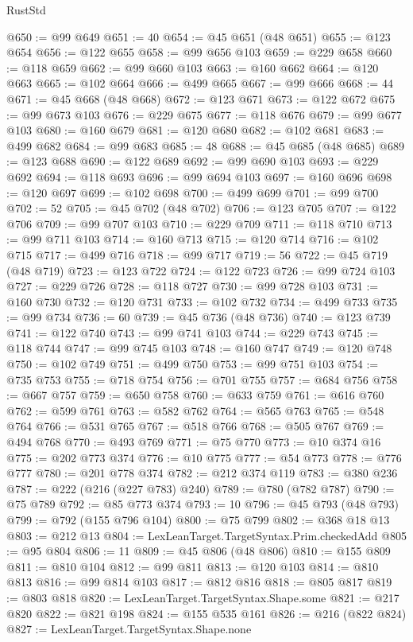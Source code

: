 \begin{lexlean}{RustStd}
\begin{coremodule}
{\begin{coremodule}
{{{{{{{{{{{{{{{{{{{{{{{{{{{{{{{{{@650 := @99 @649
@651 := 40
@654 := @45 @651 (@48 @651)
@655 := @123 @654
@656 := @122 @655
@658 := @99 @656 @103
@659 := @229 @658
@660 := @118 @659
@662 := @99 @660 @103
@663 := @160 @662
@664 := @120 @663
@665 := @102 @664
@666 := @499 @665
@667 := @99 @666
@668 := 44
@671 := @45 @668 (@48 @668)
@672 := @123 @671
@673 := @122 @672
@675 := @99 @673 @103
@676 := @229 @675
@677 := @118 @676
@679 := @99 @677 @103
@680 := @160 @679
@681 := @120 @680
@682 := @102 @681
@683 := @499 @682
@684 := @99 @683
@685 := 48
@688 := @45 @685 (@48 @685)
@689 := @123 @688
@690 := @122 @689
@692 := @99 @690 @103
@693 := @229 @692
@694 := @118 @693
@696 := @99 @694 @103
@697 := @160 @696
@698 := @120 @697
@699 := @102 @698
@700 := @499 @699
@701 := @99 @700
@702 := 52
@705 := @45 @702 (@48 @702)
@706 := @123 @705
@707 := @122 @706
@709 := @99 @707 @103
@710 := @229 @709
@711 := @118 @710
@713 := @99 @711 @103
@714 := @160 @713
@715 := @120 @714
@716 := @102 @715
@717 := @499 @716
@718 := @99 @717
@719 := 56
@722 := @45 @719 (@48 @719)
@723 := @123 @722
@724 := @122 @723
@726 := @99 @724 @103
@727 := @229 @726
@728 := @118 @727
@730 := @99 @728 @103
@731 := @160 @730
@732 := @120 @731
@733 := @102 @732
@734 := @499 @733
@735 := @99 @734
@736 := 60
@739 := @45 @736 (@48 @736)
@740 := @123 @739
@741 := @122 @740
@743 := @99 @741 @103
@744 := @229 @743
@745 := @118 @744
@747 := @99 @745 @103
@748 := @160 @747
@749 := @120 @748
@750 := @102 @749
@751 := @499 @750
@753 := @99 @751 @103
@754 := @735 @753
@755 := @718 @754
@756 := @701 @755
@757 := @684 @756
@758 := @667 @757
@759 := @650 @758
@760 := @633 @759
@761 := @616 @760
@762 := @599 @761
@763 := @582 @762
@764 := @565 @763
@765 := @548 @764
@766 := @531 @765
@767 := @518 @766
@768 := @505 @767
@769 := @494 @768
@770 := @493 @769
@771 := @75 @770
@773 := @10 @374 @16
@775 := @202 @773 @374
@776 := @10 @775
@777 := @54 @773
@778 := @776 @777
@780 := @201 @778 @374
@782 := @212 @374 @119
@783 := @380 @236
@787 := @222 (@216 (@227 @783) @240)
@789 := @780 (@782 @787)
@790 := @75 @789
@792 := @85 @773 @374
@793 := 10
@796 := @45 @793 (@48 @793)
@799 := @792 (@155 @796 @104)
@800 := @75 @799
@802 := @368 @18 @13
@803 := @212 @13
@804 := LexLeanTarget.TargetSyntax.Prim.checkedAdd
@805 := @95 @804
@806 := 11
@809 := @45 @806 (@48 @806)
@810 := @155 @809
@811 := @810 @104
@812 := @99 @811
@813 := @120 @103
@814 := @810 @813
@816 := @99 @814 @103
@817 := @812 @816
@818 := @805 @817
@819 := @803 @818
@820 := LexLeanTarget.TargetSyntax.Shape.some
@821 := @217 @820
@822 := @821 @198
@824 := @155 @535 @161
@826 := @216 (@822 @824)
@827 := LexLeanTarget.TargetSyntax.Shape.none
}}}}}}}}}}}}}}}}}}}}}}}}}}}}}}}}}
\end{coremodule}}
\end{coremodule}
\end{lexlean}
